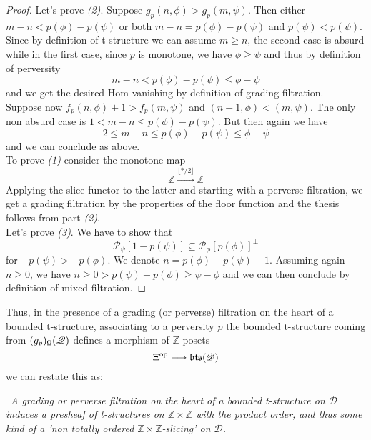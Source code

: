 \documentclass{article}
\theoremstyle{definition}
\begin{document}
\begin{proof}
Let's prove \textit{(2)}. Suppose $g_p(n,\phi) > g_p(m,\psi)$. Then either $m-n< p(\phi) - p(\psi)$ or both $m-n = p(\phi) - p(\psi)$ and $p(\psi) < p(\psi)$. Since by definition of t-structure we can assume $m \ge n$, the second case is absurd while in the first case, since $p$ is monotone, we have $\phi \ge \psi$ and thus by definition of perversity $$m-n<p(\phi)-p(\psi) \le \phi - \psi$$ 
and we get the desired Hom-vanishing by definition of grading filtration. \\

Suppose now $f_p(n,\phi) + 1 > f_p(m,\psi)$ and $(n+1,\phi) < (m,\psi)$. The only non absurd case is $ 1<m-n \le  p(\phi) - p(\psi)$. But then again we have $$2 \le m-n \le p(\phi)-p(\psi) \le \phi - \psi$$
and we can conclude as above. \\

To prove \textit{(1)} consider the monotone map $$\mathbb{Z} \overset{\lfloor * / 2 \rfloor}{\longrightarrow} \mathbb{Z}$$
Applying the slice functor to the latter and starting with a perverse filtration, we get a grading filtration by the properties of the floor function and the thesis follows from part \textit{(2)}. \\ 

Let's prove \textit{(3)}. We have to show that $$\mathscr{P}_{\psi}[1-p(\psi)] \subseteq \mathscr{P}_{\phi }[p(\phi)]^{\perp}$$ 
for $-p(\psi)>-p(\phi)$. We denote $n=p(\phi)-p(\psi)-1$. Assuming again $n \ge 0$, we have $n \ge 0 > p(\psi) - p(\phi) \ge \psi - \phi$ and we can then conclude by definition of mixed filtration. 
\end{proof}

Thus, in the presence of a grading (or perverse) filtration on the heart of a bounded t-structure, associating to a perversity $p$ the bounded t-structure coming from $(g_p)_{\textnormal{\Libra}}(\mathscr{Q})$ defines a morphism of $\mathbb{Z}$-posets $$\Xi^{\textnormal{op}} \longrightarrow \mathfrak{bts}(\mathscr{D})$$
we can restate this as: 

\begin{center}
\twonotes \ \textit{A grading or perverse filtration on the heart of a bounded t-structure on $\mathscr{D}$ induces a presheaf of t-structures on $\mathbb{Z} \times \mathbb{Z}$ with the product order, and thus some kind of a 'non totally ordered $\mathbb{Z} \times \mathbb{Z}$-slicing' on $\mathscr{D}$.}
\end{center}
\end{document}

